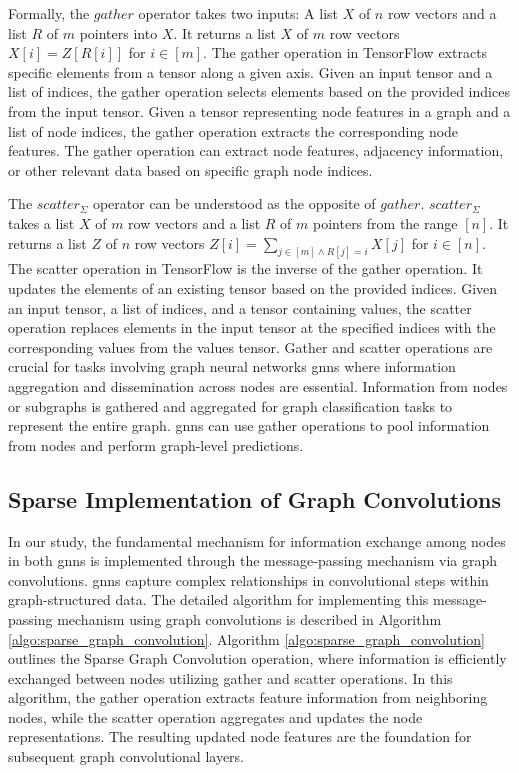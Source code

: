 
Formally, the $\mathit{gather}$ operator takes two inputs: A list $X$ of $n$ row vectors and a list $R$ of $m$ pointers into $X$.
It returns a list $X$ of $m$ row vectors $X[i] = Z[R[i]]$ for $i \in [m]$.
The gather operation in TensorFlow extracts specific elements from a tensor along a given axis. Given an input tensor and a list of indices, the gather operation selects elements based on the provided indices from the input tensor. Given a tensor representing node features in a graph and a list of node indices, the gather operation extracts the corresponding node features. The gather operation can extract node features, adjacency information, or other relevant data based on specific graph node indices.

The $\mathit{scatter}_{\Sigma}$ operator can be understood as the opposite of $\mathit{gather}$.
$\mathit{scatter}_{\Sigma}$ takes a list $X$ of $m$ row vectors and a list $R$ of $m$ pointers from the range $[n]$.
It returns a list $Z$ of $n$ row vectors $Z[i] = \sum_{j \in [m] \land R[j] = i} X[j]$ for $i \in [n]$.
The scatter operation in TensorFlow is the inverse of the gather operation. It updates the elements of an existing tensor based on the provided indices. Given an input tensor, a list of indices, and a tensor containing values, the scatter operation replaces elements in the input tensor at the specified indices with the corresponding values from the values tensor.
Gather and scatter operations are crucial for tasks involving graph neural networks \acp{gnn} where information aggregation and dissemination across nodes are essential. Information from nodes or subgraphs is gathered and aggregated for graph classification tasks to represent the entire graph.
\acp{gnn} can use gather operations to pool information from nodes and perform graph-level predictions.



\subsection{Sparse Implementation of Graph Convolutions}
\label{sec:implement:gnndropout:conv}
In our study, the fundamental mechanism for information exchange among nodes in both \acp{gnn} is implemented through the message-passing mechanism via graph convolutions.
\Acp{gnn} capture complex relationships in convolutional steps within graph-structured data. The detailed algorithm for implementing this message-passing mechanism using graph convolutions is described in Algorithm \ref{algo:sparse_graph_convolution}.
Algorithm \ref{algo:sparse_graph_convolution} outlines the Sparse Graph Convolution operation, where information is efficiently exchanged between nodes utilizing gather and scatter operations.
In this algorithm, the gather operation extracts feature information from neighboring nodes, while the scatter operation aggregates and updates the node representations.
The resulting updated node features are the foundation for subsequent graph convolutional layers.

